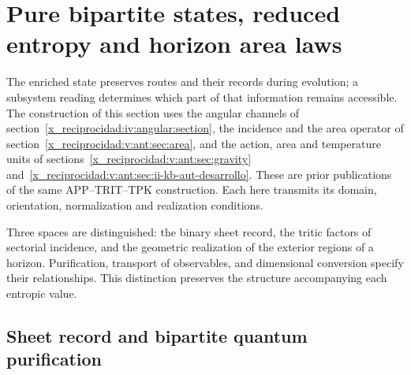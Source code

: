 


\chapter{Pure bipartite states, reduced entropy and horizon area laws}
\label{x_reciprocidad:vii:sec:horizontes-informacion}

The enriched state preserves routes and their records during
evolution; a subsystem reading determines which part of that information
remains accessible. The construction of this section uses the angular
channels of section~\ref{x_reciprocidad:iv:angular:section}, the incidence and the
area operator of section~\ref{x_reciprocidad:v:ant:sec:area}, and the action,
area and temperature units of
sections~\ref{x_reciprocidad:v:ant:sec:gravity}
and~\ref{x_reciprocidad:v:ant:sec:ii-kb-aut-desarrollo}. These are prior publications of the
same APP--TRIT--TPK construction. Each here transmits its domain,
orientation, normalization and realization conditions.

Three spaces are distinguished: the binary sheet record, the tritic
factors of sectorial incidence, and the geometric realization of the
exterior regions of a horizon. Purification, transport of observables,
and dimensional conversion specify their relationships. This
distinction preserves the structure accompanying each entropic value.

\section{Sheet record and bipartite quantum purification}
\label{x_reciprocidad:vii:subsec:hojas-purificacion}

